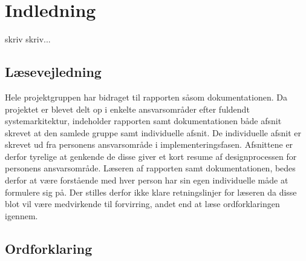 \chapter{Indledning}
\label{ch:Indledning}

skriv skriv...

\section{Læsevejledning}
Hele projektgruppen har bidraget til rapporten såsom dokumentationen. Da projektet er blevet delt op i enkelte ansvarsområder efter fuldendt systemarkitektur, indeholder rapporten samt dokumentationen både afsnit skrevet at den samlede gruppe samt individuelle afsnit. De individuelle afsnit er skrevet ud fra personens ansvarsområde i implementeringsfasen. Afsnittene er derfor tyrelige at genkende de disse giver et kort resume af designprocessen for personens ansvarsområde. Læseren af rapporten samt dokumentationen, bedes derfor at være forstående med hver person har sin egen individuelle måde at formulere sig på. Der stilles derfor ikke klare retningslinjer for læseren da disse blot vil være medvirkende til forvirring, andet end at læse ordforklaringen igennem. 

\clearpage

\section{Ordforklaring}

